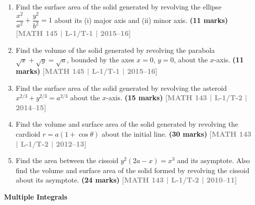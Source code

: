 \documentclass[12pt,a4paper]{article}
\newcommand{\yr}[1]{\hfill\textcolor{gray}{\small\textbf{[#1]}}}
\newcommand{\mk}[1]{\textcolor{orange!70!black}{\small\textbf{(#1 marks)}}}
\newcommand{\subtopic}[2]{%
  \vspace{10pt}
  \noindent\begin{tcolorbox}[colback=#1!8,colframe=#1,boxrule=0.6pt,arc=4pt,
    left=6pt,right=6pt,top=4pt,bottom=4pt]
    \small\bfseries\textcolor{#1}{#2}
  \end{tcolorbox}
  \vspace{2pt}
}
\begin{document}
\begin{enumerate}
\item Find the surface area of the solid generated by revolving the ellipse $\dfrac{x^{2}}{a^{2}}+\dfrac{y^{2}}{b^{2}}=1$ about its (i) major axis and (ii) minor axis.
\mk{11} \yr{MATH 145 | L-1/T-1 | 2015--16}

\item Find the volume of the solid generated by revolving the parabola $\sqrt{x}+\sqrt{y}=\sqrt{a}$, bounded by the axes $x=0$, $y=0$, about the $x$-axis.
\mk{11} \yr{MATH 145 | L-1/T-1 | 2015--16}

\item Find the surface area of the solid generated by revolving the asteroid $x^{2/3}+y^{2/3}=a^{2/3}$ about the $x$-axis.
\mk{15} \yr{MATH 143 | L-1/T-2 | 2014--15}

\item Find the volume and surface area of the solid generated by revolving the cardioid $r=a(1+\cos\theta)$ about the initial line.
\mk{30\textonehalf} \yr{MATH 143 | L-1/T-2 | 2012--13}

\item Find the area between the cissoid $y^{2}(2a-x)=x^{3}$ and its asymptote. Also find the volume and surface area of the solid formed by revolving the cissoid about its asymptote.
\mk{24\textonehalf} \yr{MATH 143 | L-1/T-2 | 2010--11}

\end{enumerate}

\subtopic{cB}{Multiple Integrals}
\label{sub:s2-multiple}
\end{document}
